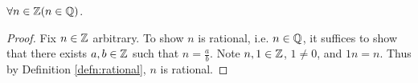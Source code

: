 \guard



\begin{prop}
\label{prop:integersAreRational}
  $\forall n\in\mathbb{Z}( n\in\mathbb{Q} )$.
\end{prop}
\begin{proof}
  Fix $n\in\mathbb{Z}$ arbitrary.
  To show $n$ is rational, i.e. $n\in\mathbb{Q}$, it suffices to show that there exists $a,b\in\mathbb{Z}$ such that $n=\frac{a}{b}$.
  Note $n,1\in\mathbb{Z}$, $1\not=0$, and $1n = n$.
  Thus by Definition \ref{defn:rational}, $n$ is rational.
\end{proof}
